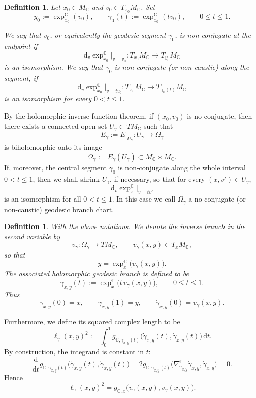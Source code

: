 \documentclass[11pt]{amsart}
\theoremstyle{plain}
\newtheorem{defn}[thm]{Definition}
\theoremstyle{definition}
\newcommand{\C}{\mathbb{C}}
\newcommand{\dd}{\mathrm d}
\begin{document}
\begin{defn}
Let $x_0\in M_{\mathbb C}$ and $v_0\in T_{x_0}M_{\mathbb C}$.  Set
\[
y_0:=\exp_{x_0}^{\mathbb C}(v_0),\qquad
\gamma_0(t):=\exp_{x_0}^{\mathbb C}(t v_0),\qquad 0\leq t\leq 1.
\]

We say that $v_0$, or equivalently the geodesic segment $\gamma_0$, is non-conjugate at the endpoint if
\[
\dd_v\exp_{x_0}^{\mathbb C}\big|_{v=v_0}:
T_{x_0}M_{\mathbb C}\longrightarrow T_{y_0}M_{\mathbb C}
\]
is an isomorphism.  We say that $\gamma_0$ is non-conjugate (or non-caustic) along the segment, if
\[
\dd_v\exp_{x_0}^{\mathbb C}\big|_{v=t v_0}:
T_{x_0}M_{\mathbb C}\longrightarrow T_{\gamma_0(t)}M_{\mathbb C}
\]
is an isomorphism for every $0<t\leq 1$.
\end{defn}

By the holomorphic inverse function theorem, if
$(x_0,v_0)$ is no-conjugate, then there exists a connected open set $U_\gamma\subset TM_{\mathbb C}$ such that
\[
E_\gamma:=E|_{U_\gamma}:U_\gamma\longrightarrow \Omega_\gamma
\]
is biholomorphic onto its image
\[
\Omega_\gamma:=E_\gamma(U_\gamma)\subset M_{\mathbb C}\times M_{\mathbb C}.
\]
{If, moreover, the central segment $\gamma_0$ is non-conjugate along the
whole interval $0<t\leq 1$, then we shall shrink $U_\gamma$, if
necessary, so that for every $(x,v')\in U_\gamma$,
\[
\dd_v\exp_x^{\mathbb C}\big|_{v=t v'}
\]
is an isomorphism for all $0<t\leq 1$.  In this case we call $\Omega_\gamma$ a no-conjugate (or non-caustic) geodesic branch chart.}

\begin{defn}
With the above notations. We denote the inverse branch in the second variable by
\[
v_\gamma:\Omega_\gamma\longrightarrow TM_{\mathbb C},
\qquad v_\gamma(x,y)\in T_xM_{\mathbb C},
\]
so that
\[
y=\exp_x^{\mathbb C}\bigl(v_\gamma(x,y)\bigr).
\]
The associated holomorphic geodesic branch is defined to be
\[
\gamma_{x,y}(t):=\exp_x^{\mathbb C}\bigl(t\,v_\gamma(x,y)\bigr),\qquad
0\leq t\leq 1.
\]
Thus
\[
\gamma_{x,y}(0)=x,\qquad\gamma_{x,y}(1)=y,\qquad
\dot\gamma_{x,y}(0)=v_\gamma(x,y).
\]
\end{defn}


Furthermore, we define its squared complex length to be
\[
\ell_\gamma(x,y)^2:=\int_0^1g_{\mathbb C,\gamma_{x,y}(t)}
\bigl(\dot\gamma_{x,y}(t),\dot\gamma_{x,y}(t)\bigr)\,\dd t.
\]
By construction, the integrand is constant
in $t$:
\[
\frac{\dd}{\dd t}g_{\mathbb C,\gamma_{x,y}(t)}\bigl(\dot\gamma_{x,y}(t),\dot\gamma_{x,y}(t)\bigr)
=2g_{\mathbb C,\gamma_{x,y}(t)}\bigl(\nabla^{\mathbb C}_{\dot\gamma_{x,y}}\dot\gamma_{x,y},\dot\gamma_{x,y}\bigr)=0.
\]
Hence
\[
\ell_\gamma(x,y)^2=g_{\C,x}\bigl(v_\gamma(x,y),v_\gamma(x,y)\bigr).
\]
\end{document}
